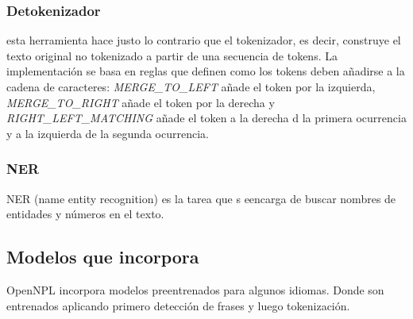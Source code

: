 \subsubsection{Detokenizador}
esta herramienta hace justo lo contrario que el tokenizador, es decir, construye el texto original no tokenizado a partir de una secuencia de tokens. La implementación se basa en reglas que definen como los tokens deben añadirse a la cadena de caracteres:  \textsl{MERGE\_TO\_LEFT} añade el token por la izquierda, \textsl{MERGE\_TO\_RIGHT} añade el token por la derecha y \textsl{RIGHT\_LEFT\_MATCHING} añade el token a la derecha d la primera ocurrencia y a la izquierda de la segunda ocurrencia.
\subsubsection{NER}
NER (name entity recognition) es la tarea que s eencarga de buscar nombres de entidades y números en el texto.
\subsection{Modelos que incorpora}
OpenNPL incorpora modelos preentrenados para algunos idiomas. Donde  son entrenados aplicando primero detección de frases y luego tokenización. 

 
  



 